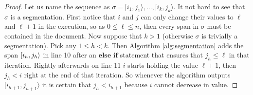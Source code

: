 
\begin{proof}
	Let us name the sequence as $\sigma = [i_1, j_1\rangle, \ldots, [i_k,
	j_k\rangle$. It not hard to see that $\sigma$ is a segmentation. First
	notice that $i$ and $j$ can only change their values to $\ell$ and $\ell +
	1$ in the execution, so as $ 0 \leq \ell \leq n$, then every span in
	$\sigma$ must be contained in the document. Now suppose that $k > 1$
	(otherwise $\sigma$ is trivially a segmentation). Pick any $1 \leq h < k$.
	Then Algorithm \ref*{alg:segmentation} adds the span $[i_h, j_h\rangle$ in
	line 10 after an $\textbf{else if}$ statement that ensures that $j_h \leq
	\ell$ in that iteration. Rightly afterwards on line 11 $i$ starts holding
	the value $\ell + 1$, then $j_h < i$ right at the end of that iteration. So
	whenever the algorithm outputs $[i_{h+1}, j_{h+1}\rangle$ it is certain that
	$j_h < i_{h+1}$ because $i$ cannot decrease in value. 


\end{proof}
